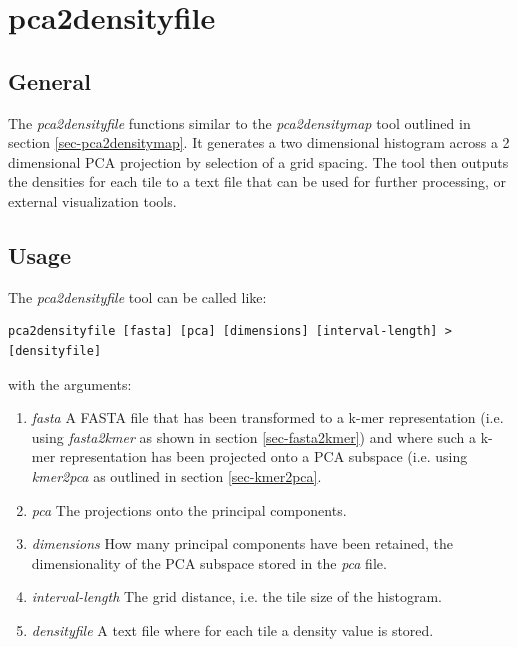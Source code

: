 \section{pca2densityfile} \label{sec-pca2densityfile}

\subsection{General}

The \emph{pca2densityfile} functions similar to the
\emph{pca2densitymap} tool outlined in section
\ref{sec-pca2densitymap}. It generates a two dimensional histogram
across a 2 dimensional PCA projection by selection of a grid
spacing. The tool then outputs the densities for each tile to a text
file that can be used for further processing, or external
visualization tools.

\subsection{Usage}

The \emph{pca2densityfile} tool can be called like:
\begin{lstlisting}
pca2densityfile [fasta] [pca] [dimensions] [interval-length] > [densityfile]
\end{lstlisting}
with the arguments:
\begin{enumerate}
  \item \emph{fasta} A FASTA file that has been transformed to a k-mer
    representation (i.e. using \emph{fasta2kmer} as shown in section
    \ref{sec-fasta2kmer}) and where such a k-mer representation has been
    projected onto a PCA subspace (i.e. using \emph{kmer2pca} as
    outlined in section \ref{sec-kmer2pca}.
  \item \emph{pca} The projections onto the principal components.
  \item \emph{dimensions} How many principal components have been
    retained, the dimensionality of the PCA subspace stored in the
    \emph{pca} file.
  \item \emph{interval-length} The grid distance, i.e. the tile size
    of the histogram.
  \item \emph{densityfile} A text file where for each tile a density
    value is stored.
\end{enumerate}

